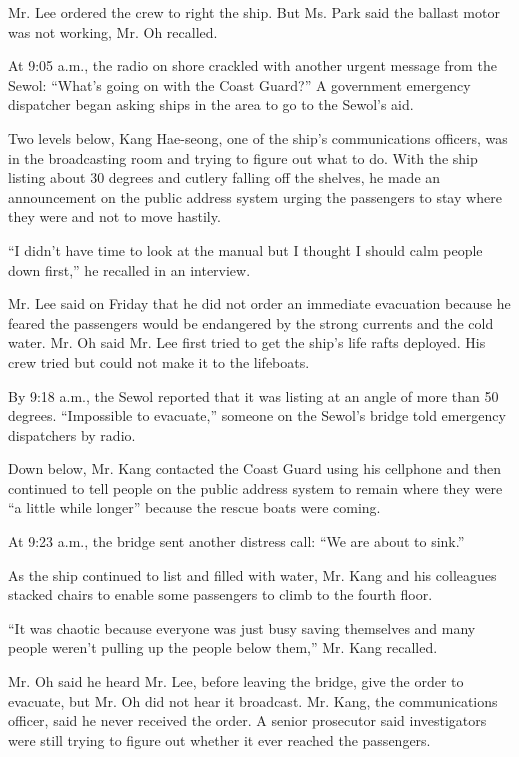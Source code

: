 Mr. Lee ordered the crew to right the ship. But Ms. Park said the
ballast motor was not working, Mr. Oh recalled.

At 9:05 a.m., the radio on shore crackled with another urgent message
from the Sewol: ``What's going on with the Coast Guard?'' A government
emergency dispatcher began asking ships in the area to go to the Sewol's
aid.

Two levels below, Kang Hae-seong, one of the ship's communications
officers, was in the broadcasting room and trying to figure out what to
do. With the ship listing about 30 degrees and cutlery falling off the
shelves, he made an announcement on the public address system urging the
passengers to stay where they were and not to move hastily.

``I didn't have time to look at the manual but I thought I should calm
people down first,'' he recalled in an interview.

Mr. Lee said on Friday that he did not order an immediate evacuation
because he feared the passengers would be endangered by the strong
currents and the cold water. Mr. Oh said Mr. Lee first tried to get the
ship's life rafts deployed. His crew tried but could not make it to the
lifeboats.

By 9:18 a.m., the Sewol reported that it was listing at an angle of more
than 50 degrees. ``Impossible to evacuate,'' someone on the Sewol's
bridge told emergency dispatchers by radio.

Down below, Mr. Kang contacted the Coast Guard using his cellphone and
then continued to tell people on the public address system to remain
where they were ``a little while longer'' because the rescue boats were
coming.

At 9:23 a.m., the bridge sent another distress call: ``We are about to
sink.''

As the ship continued to list and filled with water, Mr. Kang and his
colleagues stacked chairs to enable some passengers to climb to the
fourth floor.

``It was chaotic because everyone was just busy saving themselves and
many people weren't pulling up the people below them,'' Mr. Kang
recalled.

Mr. Oh said he heard Mr. Lee, before leaving the bridge, give the order
to evacuate, but Mr. Oh did not hear it broadcast. Mr. Kang, the
communications officer, said he never received the order. A senior
prosecutor said investigators were still trying to figure out whether it
ever reached the passengers.


